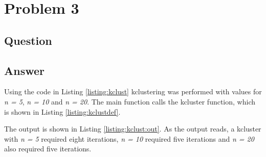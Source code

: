 \section{Problem 3}

\subsection{Question}


\subsection{Answer}

Using the code in Listing \ref{listing:kclust} kclustering was performed with values for {\it n = 5}, {\it n = 10} and {\it n = 20}. The main function calls the kcluster function, which is shown in Listing \ref{listing:kclustdef}.





The output is shown in Listing \ref{listing:kclust:out}. As the output reads, a kcluster with {\it n = 5} required eight iterations, {\it n = 10} required five iterations and {\it n = 20} also required five iterations.

